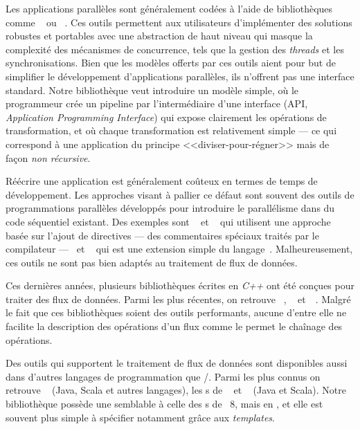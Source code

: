 \begin{introduction}
Les applications parall\`eles sont g\'en\'eralement cod\'ees \`a l'aide de biblioth\`eques comme ~\citep{AldinucciEtAl14} ou ~\citep{Reinders07}. Ces outils permettent aux utilisateurs d'implémenter des solutions robustes et portables avec une abstraction de haut niveau qui masque la complexit\'e des m\'ecanismes de concurrence, tels que la gestion des \emph{threads} et les synchronisations. Bien que les mod\`eles offerts par ces outils aient pour but de simplifier le d\'eveloppement d'applications parall\`eles, ils n'offrent pas une interface standard. Notre bibliothèque veut introduire un mod\`ele simple, o\`u le programmeur cr\'ee un pipeline par l'interm\'ediaire d'une interface (API, \emph{Application Programming Interface}) qui expose clairement les op\'erations de transformation, et o\`u chaque transformation est relativement simple --- ce qui correspond \`a une application du
principe <<diviser-pour-r\'egner>> mais de fa\c{c}on \emph{non r\'ecursive}.

R\'e\'ecrire une application est g\'en\'eralement co\^uteux en termes de temps de d\'eveloppement. Les approches visant \`a pallier ce d\'efaut sont souvent des outils de programmations parall\`eles d\'evelopp\'es pour introduire le parall\'elisme dans du code s\'equentiel existant. Des exemples sont ~\citep{ChandraEtAl01} et ~\citep{farber2016parallel} qui utilisent une approche bas\'ee sur l'ajout de directives --- des commentaires sp\'eciaux trait\'es par le compilateur ---~ et ~\citep{leiserson1998programming} qui est une extension simple du langage~. Malheureusement, ces outils ne sont pas bien adapt\'es au traitement de flux de donn\'ees.

Ces derni\`eres ann\'ees, plusieurs biblioth\`eques \'ecrites en \emph{C++} ont \'et\'e con\c{c}ues pour traiter des flux de donn\'ees. Parmi les plus r\'ecentes, on retrouve ~\citep{beard2017raftlib}, ~\citep{starPuReferenceEnLigne} et~~\citep{skePuReferenceEnLigne}. Malgr\'e le fait que ces bibliothèques soient des outils performants, aucune d'entre elle ne facilite la description des op\'erations d'un flux comme le permet le cha\^inage des op\'erations.


Des outils qui supportent le traitement de flux de donn\'ees sont disponibles aussi dans d'autres langages de programmation que /. Parmi les plus connus on retrouve ~\citep{frampton2015mastering} (Java, Scala et autres langages), les s de ~\citep{warburton2014java} et ~\citep{flinkReferenceEnLigne} (Java et Scala). Notre bibliothèque possède une  semblable \`a celle des s de ~8, mais en , et elle est souvent plus simple \`a sp\'ecifier notamment gr\^ace aux \emph{templates}.




\end{introduction}
